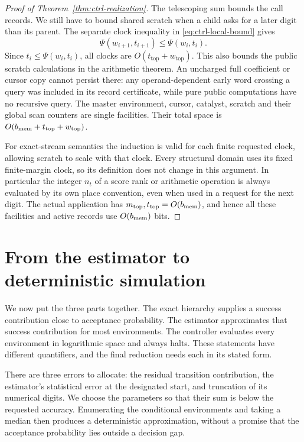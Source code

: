 \documentclass[11pt]{article}
\numberwithin{equation}{section}
\theoremstyle{definition}
\theoremstyle{remark}
\begin{document}
\begin{proof}[Proof of Theorem~\ref{thm:ctrl-realization}]
The telescoping sum bounds the call records. We still have to bound shared scratch when a child asks for a later digit than its parent. The separate clock inequality in \eqref{eq:ctrl-local-bound} gives
\begin{equation}\label{eq:ctrl-clock-invariant}
 \Psi(w_{i+1},t_{i+1})\le\Psi(w_i,t_i).
\end{equation}
Since $t_i\le\Psi(w_i,t_i)$, all clocks are
$O(t_{\mathrm{top}}+w_{\mathrm{top}})$.
This also bounds the public scratch calculations in the arithmetic
theorem.  An uncharged full coefficient or cursor copy cannot persist
there: any operand-dependent early word crossing a query was included
in its record certificate, while pure public computations have no
recursive query.  The master environment, cursor, catalyst, scratch
and their global scan counters are single facilities.  Their total
space is $O({b_{\rm mem}}+t_{\mathrm{top}}+w_{\mathrm{top}})$.

For exact-stream semantics the induction is valid for each finite
requested clock, allowing scratch to scale with that clock.  Every
structural domain uses its fixed finite-margin clock, so its definition
does not change in this argument.  In particular the integer ${n}_t$ of a
score rank or arithmetic operation is always evaluated by its own
place convention, even when used in a request for the next digit.
The actual application has ${m}_{\mathrm{top}},t_{\mathrm{top}}=O({b_{\rm mem}})$,
and hence all these facilities and active records use $O({b_{\rm mem}})$ bits.
\end{proof}





\section{From the estimator to deterministic simulation}
\label{sec:conclusion}

We now put the three parts together. The exact hierarchy supplies a success contribution close to acceptance probability. The estimator approximates that success contribution for most environments. The controller evaluates every environment in logarithmic space and always halts. These statements have different quantifiers, and the final reduction needs each in its stated form.

There are three errors to allocate: the residual transition contribution, the estimator's statistical error at the designated start, and truncation of its numerical digits. We choose the parameters so that their sum is below the requested accuracy. Enumerating the conditional environments and taking a median then produces a deterministic approximation, without a promise that the acceptance probability lies outside a decision gap.
\end{document}
